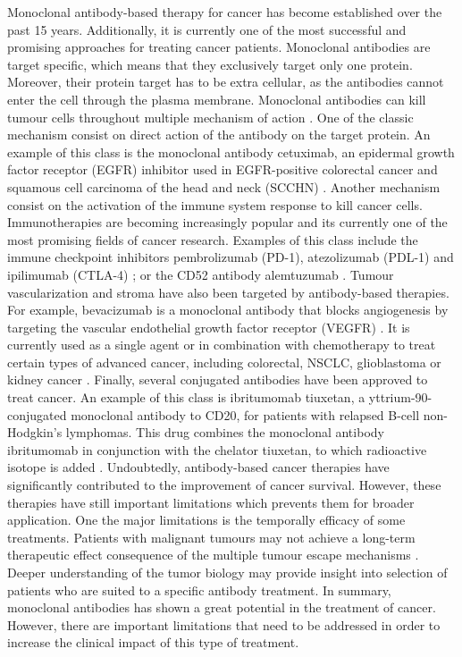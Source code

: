 \documentclass[12pt, b5paper,twoside]{tesi_upf}
\begin{document}
\par  Monoclonal antibody-based therapy for cancer has become established over the past 15 years. Additionally, it is currently one of the most successful and promising approaches for treating cancer patients. Monoclonal antibodies are target specific, which means that they exclusively target only one protein. Moreover, their protein target has to be extra cellular, as the antibodies cannot enter the cell through the plasma membrane. Monoclonal antibodies can kill tumour cells throughout multiple mechanism of action \cite{Scott2012}. One of the classic mechanism consist on direct action of the antibody on the target protein. An example of this class is the monoclonal antibody cetuximab, an epidermal growth factor receptor (EGFR) inhibitor used in EGFR-positive colorectal cancer \cite{Jonker2007} and squamous cell carcinoma of the head and neck (SCCHN) \cite{Tejani2010}. Another mechanism consist on the activation of the immune system response to kill cancer cells. Immunotherapies are becoming increasingly popular and its currently one of the most promising fields of cancer research.  Examples of this class include the immune checkpoint inhibitors  pembrolizumab (PD-1), atezolizumab (PDL-1) and ipilimumab (CTLA-4) \cite{Postow2015}; or the CD52 antibody alemtuzumab \cite{Demko2008}. Tumour vascularization and stroma have also been targeted by antibody-based therapies. For example, bevacizumab is a monoclonal antibody that blocks angiogenesis by targeting the vascular endothelial growth factor receptor (VEGFR) \cite{Ferrara2004}. It is currently used as a single agent or in combination with chemotherapy to treat certain types of advanced cancer, including colorectal, NSCLC, glioblastoma or kidney cancer \cite{Keating2014}. Finally, several conjugated antibodies have been approved to treat cancer. An example of this class is ibritumomab tiuxetan, a yttrium-90-conjugated monoclonal antibody to CD20, for patients with relapsed B-cell non-Hodgkin's lymphomas. This drug combines the monoclonal antibody ibritumomab in conjunction with the chelator tiuxetan, to which radioactive isotope is added \cite{Witzig2002}. Undoubtedly, antibody-based cancer therapies have significantly contributed to the improvement of cancer survival. However, these therapies have still important limitations which prevents them for broader application. One the major limitations is the temporally efficacy of some treatments. Patients with malignant tumours may not achieve a long-term therapeutic effect consequence of the multiple tumour escape mechanisms \cite{Scott2012}. Deeper understanding of the tumor biology may provide insight into selection of patients who are suited to a specific antibody treatment. In summary, monoclonal antibodies has shown a great potential in the treatment of cancer. However, there are important limitations that need to be addressed in order to increase the clinical impact of this type of treatment.  
\end{document}
